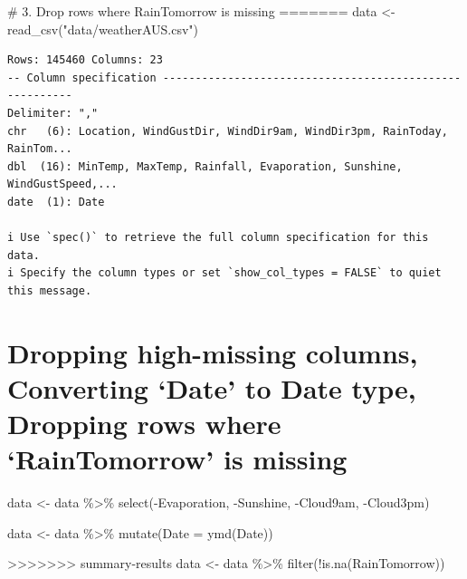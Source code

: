 \documentclass[
  letterpaper,
  DIV=11,
  numbers=noendperiod]{scrartcl}
\newenvironment{Shaded}{\begin{snugshade}}{\end{snugshade}}
\newcommand{\AttributeTok}[1]{\textcolor[rgb]{0.40,0.45,0.13}{#1}}
\newcommand{\CommentTok}[1]{\textcolor[rgb]{0.37,0.37,0.37}{#1}}
\newcommand{\FunctionTok}[1]{\textcolor[rgb]{0.28,0.35,0.67}{#1}}
\newcommand{\NormalTok}[1]{\textcolor[rgb]{0.00,0.23,0.31}{#1}}
\newcommand{\OtherTok}[1]{\textcolor[rgb]{0.00,0.23,0.31}{#1}}
\newcommand{\SpecialCharTok}[1]{\textcolor[rgb]{0.37,0.37,0.37}{#1}}
\newcommand{\StringTok}[1]{\textcolor[rgb]{0.13,0.47,0.30}{#1}}
\begin{document}
\begin{Shaded}
\begin{Highlighting}[]
\begin{Shaded}
\begin{Highlighting}[]
\CommentTok{\# 3. Drop rows where \textquotesingle{}RainTomorrow\textquotesingle{} is missing}
=======
\NormalTok{data }\OtherTok{\textless{}{-}} \FunctionTok{read\_csv}\NormalTok{(}\StringTok{"data/weatherAUS.csv"}\NormalTok{)}
\end{Highlighting}
\end{Shaded}

\begin{verbatim}
Rows: 145460 Columns: 23
-- Column specification --------------------------------------------------------
Delimiter: ","
chr   (6): Location, WindGustDir, WindDir9am, WindDir3pm, RainToday, RainTom...
dbl  (16): MinTemp, MaxTemp, Rainfall, Evaporation, Sunshine, WindGustSpeed,...
date  (1): Date

i Use `spec()` to retrieve the full column specification for this data.
i Specify the column types or set `show_col_types = FALSE` to quiet this message.
\end{verbatim}

\section{Dropping high-missing columns, Converting `Date' to Date type,
Dropping rows where `RainTomorrow' is
missing}\label{dropping-high-missing-columns-converting-date-to-date-type-dropping-rows-where-raintomorrow-is-missing}

\begin{Shaded}
\begin{Highlighting}[]
\NormalTok{data }\OtherTok{\textless{}{-}}\NormalTok{ data }\SpecialCharTok{\%\textgreater{}\%}
  \FunctionTok{select}\NormalTok{(}\SpecialCharTok{{-}}\NormalTok{Evaporation, }\SpecialCharTok{{-}}\NormalTok{Sunshine, }\SpecialCharTok{{-}}\NormalTok{Cloud9am, }\SpecialCharTok{{-}}\NormalTok{Cloud3pm)}

\NormalTok{data }\OtherTok{\textless{}{-}}\NormalTok{ data }\SpecialCharTok{\%\textgreater{}\%}
  \FunctionTok{mutate}\NormalTok{(}\AttributeTok{Date =} \FunctionTok{ymd}\NormalTok{(Date))}

>>>>>>> summary-results
\NormalTok{data }\OtherTok{\textless{}{-}}\NormalTok{ data }\SpecialCharTok{\%\textgreater{}\%}
  \FunctionTok{filter}\NormalTok{(}\SpecialCharTok{!}\FunctionTok{is.na}\NormalTok{(RainTomorrow))}
\end{Highlighting}
\end{Shaded}


\end{Highlighting}
\end{Shaded}
\end{document}
